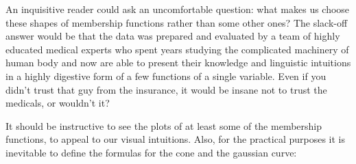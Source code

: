 An inquisitive reader could ask an uncomfortable question:
what makes us choose these shapes of membership functions
rather than some other ones? The slack-off answer would be
that the data was prepared and evaluated by a team of
highly educated medical experts who spent years studying
the complicated machinery of human body and now are able
to present their knowledge and linguistic intuitions
in a highly digestive form of a few functions of a single
variable. Even if you didn't trust that guy from the
insurance, it would be insane not to trust the medicals,
or wouldn't it?




It should be instructive to see the plots of at least some of
the membership functions, to appeal to our visual intuitions.
Also, for the practical purposes it is inevitable to define the
formulas for the cone and the gaussian curve:

